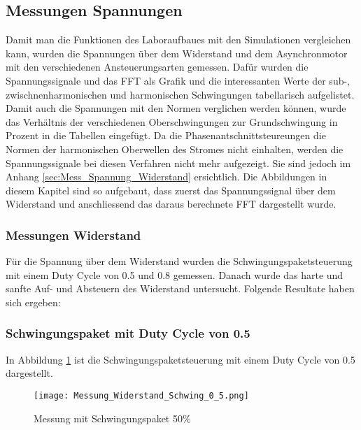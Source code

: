 \newpage
\subsection{Messungen Spannungen}
Damit man die Funktionen des Laboraufbaues mit den Simulationen vergleichen kann, wurden die Spannungen über dem Widerstand und dem Asynchronmotor mit den verschiedenen Ansteuerungsarten gemessen. Dafür wurden die Spannungssignale und das FFT als Grafik und die interessanten Werte der sub-, zwischnenharmonischen und harmonischen Schwingungen tabellarisch aufgelistet. Damit auch die Spannungen mit den Normen verglichen werden können, wurde das Verhältnis der verschiedenen Oberschwingungen zur Grundschwingung in Prozent in die Tabellen eingefügt. Da die Phasenantschnittsteureungen die Normen der harmonischen Oberwellen des Stromes nicht einhalten, werden die Spannungssignale bei diesen Verfahren nicht mehr aufgezeigt. Sie sind jedoch im Anhang \ref{sec:Mess_Spannung_Widerstand} ersichtlich. Die Abbildungen in diesem Kapitel sind so aufgebaut, dass zuerst das Spannungssignal über dem Widerstand und anschliessend das daraus berechnete FFT dargestellt wurde.

\subsubsection{Messungen Widerstand}
Für die Spannung über dem Widerstand wurden die Schwingungspaketsteuerung mit einem Duty Cycle von 0.5 und 0.8 gemessen. Danach wurde das harte und sanfte Auf- und Absteuern des Widerstand untersucht. Folgende Resultate haben sich ergeben:


\subsubsection*{Schwingungspaket mit Duty Cycle von 0.5}

In Abbildung \ref{fig:Mess_Schwing_50} ist die Schwingungspaketsteuerung mit einem Duty Cycle von 0.5 dargestellt.


\begin{figure}[ht!]
	\centering
	\texttt{[image: Messung\_Widerstand\_Schwing\_0\_5.png]}	
	\caption{Messung mit Schwingungspaket 50\%}\label{fig:Mess_Schwing_50}
\end{figure}


